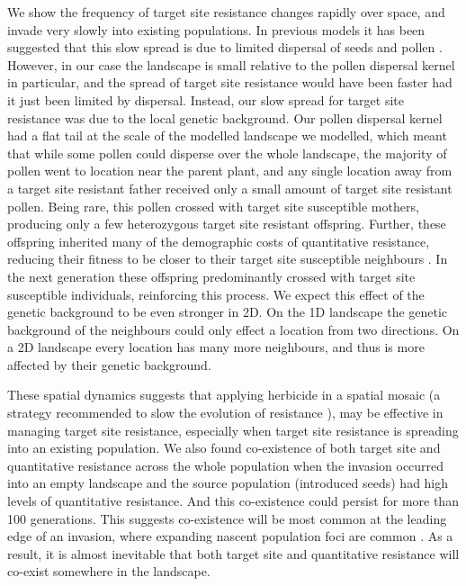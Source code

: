 \documentclass[10pt,letterpaper]{article}
\begin{document}
We show the frequency of target site resistance changes rapidly over space, and invade very slowly into existing populations. In previous models it has been suggested that this slow spread is due to limited dispersal of seeds and pollen \cite{Some2017}. However, in our case the landscape is small relative to the pollen dispersal kernel in particular, and the spread of target site resistance would have been faster had it just been limited by dispersal. Instead, our slow spread for target site resistance was due to the local genetic background. Our pollen dispersal kernel had a flat tail at the scale of the modelled landscape we modelled, which meant that while some pollen could disperse over the whole landscape, the majority of pollen went to location near the parent plant, and any single location away from a target site resistant father received only a small amount of target site resistant pollen. Being rare, this pollen crossed with target site susceptible mothers, producing only a few heterozygous target site resistant offspring. Further, these offspring inherited many of the demographic costs of quantitative resistance, reducing their fitness to be closer to their target site susceptible neighbours \cite{Chev2008}. In the next generation these offspring predominantly crossed with target site susceptible individuals, reinforcing this process. We expect this effect of the genetic background to be even stronger in 2D. On the 1D landscape the genetic background of the neighbours could only effect a location from two directions. On a 2D landscape every location has many more neighbours, and thus is more affected by their genetic background.	                

These spatial dynamics suggests that applying herbicide in a spatial mosaic (a strategy recommended to slow the evolution of resistance \cite{Rex2013}), may be effective in managing target site resistance, especially when target site resistance is spreading into an existing population. We also found co-existence of both target site and quantitative resistance across the whole population when the invasion occurred into an empty landscape and the source population (introduced seeds) had high levels of quantitative resistance. And this co-existence could persist for more than 100 generations. This suggests co-existence will be most common at the leading edge of an invasion, where expanding nascent population foci are common \cite{Mooy1988}. As a result, it is almost inevitable that both target site and quantitative resistance will co-exist somewhere in the landscape.
\end{document}
